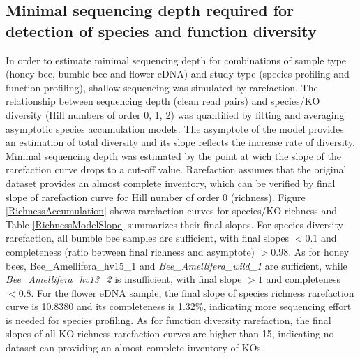 \documentclass[11pt]{article}
\begin{document}
    \subsection{Minimal sequencing depth required for detection of species and function diversity}
    In order to estimate minimal sequencing depth for combinations of sample type (honey bee, bumble bee and flower eDNA) and study type (species profiling and function profiling), shallow sequencing was simulated by rarefaction. 
    The relationship between sequencing depth (clean read pairs) and species/KO diversity (Hill numbers of order 0, 1, 2) was quantified by fitting and averaging asymptotic species accumulation models. 
    The asymptote of the model provides an estimation of total diversity and its slope reflects the increase rate of diversity. 
    Minimal sequencing depth was estimated by the point at wich the slope of the rarefaction curve drops to a cut-off value.
    \newline
    Rarefaction assumes that the original dataset provides an almost complete inventory, which can be verified by final slope of rarefaction curve for Hill number of order 0 (richness). 
    Figure \ref{RichnessAccumulation} shows rarefaction curves for species/KO richness and Table \ref{RichnessModelSlope} summarizes their final slopes. 
    For species diversity rarefaction, all bumble bee samples are sufficient, with final slopes $< 0.1$ and completeness (ratio between final richness and asymptote) $> 0.98$. 
    As for honey bees, {Bee\_Amellifera\_hv15\_1} and \textit{Bee\_Amellifera\_wild\_1} are sufficient, while \textit{Bee\_Amellifera\_hv13\_2} is insufficient, with final slope $> 1$ and completeness $< 0.8$. 
    For the flower eDNA sample, the final slope of species richness rarefaction curve is 10.8380 and its completeness is 1.32\%, indicating more sequencing effort is needed for species profiling. 
    As for function diversity rarefaction, the final slopes of all KO richness rarefaction curves are higher than 15, indicating no dataset can providing an almost complete inventory of KOs. 
\end{document}
